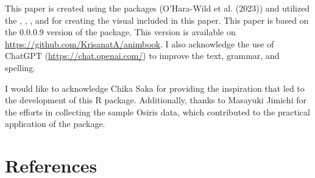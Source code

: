 This paper is created using the  packages (O'Hara-Wild et al. (2023)) and utilized the , , , and  for creating the visual included in this paper. This paper is based on the 0.0.0.9 version of the  package. This version is available on \url{https://github.com/KrisanatA/animbook}.
I also acknowledge the use of ChatGPT (\url{https://chat.openai.com/}) to improve the text, grammar, and spelling.

I would like to acknowledge Chika Saka for providing the inspiration that led to the development of this R package. Additionally, thanks to Masayuki Jimichi for the efforts in collecting the sample Osiris data, which contributed to the practical application of the package.

\hypertarget{references}{%
\section*{References}\label{references}}

